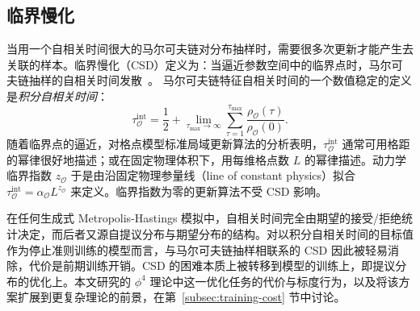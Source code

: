 \subsection{临界慢化}
\label{subsec:CSD-theory}

当用一个自相关时间很大的马尔可夫链对分布抽样时，需要很多次更新才能产生去关联的样本。临界慢化（CSD）定义为：当逼近参数空间中的临界点时，马尔可夫链抽样的自相关时间发散~\cite{Wolff:1989wq}。
%
马尔可夫链特征自相关时间的一个数值稳定的定义是\emph{积分自相关时间}：
%
\begin{equation}
    \tau_\mathcal{O}^\text{int} = \frac{1}{2} + \lim_{\tau_\text{max} \rightarrow \infty}\sum_{\tau=1}^{\tau_\text{max}} \frac{\rho_\mathcal{O}(\tau)}{\rho_\mathcal{O}(0)}.
\end{equation}
随着临界点的逼近，对格点模型标准局域更新算法的分析表明，$\tau_\mathcal{O}^\text{int}$ 通常可用格距的幂律很好地描述；或在固定物理体积下，用每维格点数 $L$ 的幂律描述。动力学临界指数 $z_\mathcal{O}$ 于是由沿固定物理参量线（line of constant physics）拟合 $\tau_\mathcal{O}^\text{int} = \alpha_\mathcal{O} L^{z_\mathcal{O}}$ 来定义。临界指数为零的更新算法不受 CSD 影响。

在任何生成式 Metropolis-Hastings 模拟中，自相关时间完全由期望的接受/拒绝统计决定，而后者又源自提议分布与期望分布的结构。对以积分自相关时间的目标值作为停止准则训练的模型而言，与马尔可夫链抽样相联系的 CSD 因此被轻易消除，代价是前期训练开销。CSD 的困难本质上被转移到模型的训练上，即提议分布的优化上。本文研究的 $\phi^4$ 理论中这一优化任务的代价与标度行为，以及将该方案扩展到更复杂理论的前景，在第~\ref{subsec:training-cost} 节中讨论。
